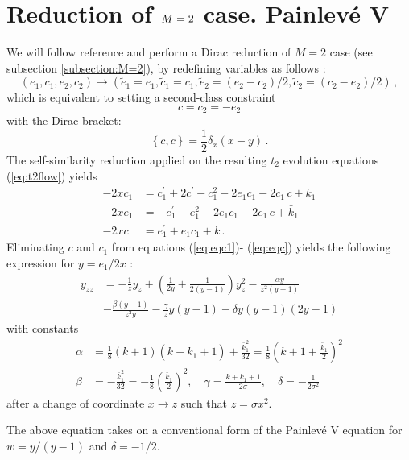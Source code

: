 \documentclass[12pt]{article}
\numberwithin{equation}{section}
\def\rf#1{(\ref{eq:#1})}
\def\lab#1{\label{eq:#1}}
\begin{document}
\section{Reduction of $\boldmath{M=2}$ case. Painlev\'e V}
\label{section:reduction}
We will follow reference \cite{Aratyn:1994vc} and perform
a Dirac reduction of $M=2$ case (see subsection \ref{subsection:M=2}),
by redefining  variables as follows :
\[
\left( e_1, c_1, e_2 ,c_2 \right) \rightarrow 
\left( {\tilde e}_1=e_1, {\tilde c}_1=c_1, {\tilde e}_2=(e_2-c_2)/2 ,
{\tilde c}_2=(c_2-e_2)/2 \right) \, ,
\]
which is equivalent to setting a second-class constraint 
\[
c= c_2=-e_2
\]
with the Dirac bracket:
\[ \left\{ c , c \right\}= \frac12 \delta_x (x-y)\, .
\]
The self-similarity reduction applied on the resulting
$t_2$ evolution equations \rf{t2flow} yields
\begin{align}
-2 x c_1&= c^{\prime}_{1}+2 c^{\prime}-c^{2}_{1}-2 e_{1} c_{1}-2 c_{1}\, c+ 
k_1 \lab{eqc1} \\
-2 x e_1 &=  -e^{\prime}_{1}-e^{2}_{1}-2 e_{1} c_{1}-2 e_{1} \,c  +{\bar k}_1 
\lab{eqe1} \\
-2 x c&=  e^{\prime}_{1}+ e_{1} c_{1} +k \, . \lab{eqc}
\end{align}
Eliminating $c$ and $c_1$ from equations \rf{eqc1}-
\rf{eqc} yields the following expression for
$y=e_1/2x$ :
\begin{equation} \begin{split}
y_{zz}& = - \frac1z y_z+ \left( \frac{1}{2y}+\frac{1}{2(y-1)} \right) y_z^2
- \frac{\alpha y}{z^2 (y-1)} \\
&-\frac{\beta (y-1)}{z^2 y} - \frac{\gamma}{z} y (y-1) 
-\delta y (y-1) (2y-1)
\lab{P5y}
\end{split}
\end{equation}
with constants
\begin{equation}
\begin{split}
\alpha&= \frac18 (k+1)(k+{\bar k}_1+1)+ \frac{{\bar k}_1^2}{32}
=\frac18\left(k+1+\frac{{\bar k}_1}{2}\right)^2 \\
\beta&=-\frac{{\bar k}_1^2}{32}= -\frac18\left(\frac{{\bar
k}_1}{2}\right)^2 , \quad
\gamma= \frac{k+ k_1+1}{2 \sigma}, \quad \delta =-\frac{1}{2 \sigma^2}
\lab{abc}
\end{split}
\end{equation}
after a change of coordinate $x \to z$ such that $z= \sigma x^2$.


The above equation takes on a conventional form of the Painlev\'e V
equation for $w=y/(y-1)$ and $\delta=-1/2$.
\end{document}
